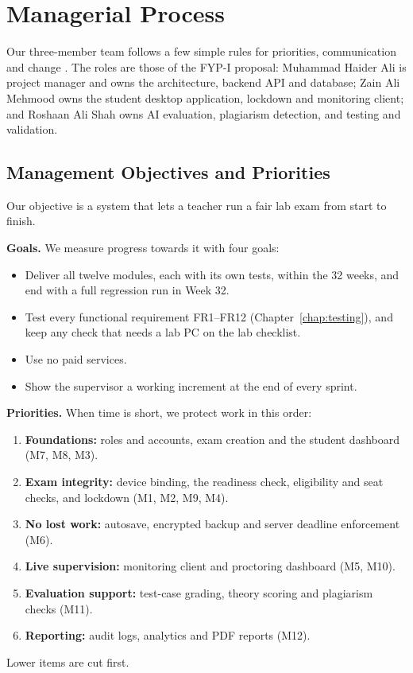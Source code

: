 \section{Managerial Process}
\label{sec:managerial}

Our three-member team follows a few simple rules for priorities, communication and change \cite{pmbok6}. The roles are those of the FYP-I proposal: Muhammad Haider Ali is project manager and owns the architecture, backend API and database; Zain Ali Mehmood owns the student desktop application, lockdown and monitoring client; and Roshaan Ali Shah owns AI evaluation, plagiarism detection, and testing and validation.

\subsection{Management Objectives and Priorities}

Our objective is a system that lets a teacher run a fair lab exam from start to finish.

\DiagramBarrier
\textbf{Goals.} We measure progress towards it with four goals:
\begin{itemize}
    \item Deliver all twelve modules, each with its own tests, within the 32 weeks, and end with a full regression run in Week 32.
    \item Test every functional requirement FR1--FR12 (Chapter~\ref{chap:testing}), and keep any check that needs a lab PC on the lab checklist.
    \item Use no paid services.
    \item Show the supervisor a working increment at the end of every sprint.
\end{itemize}

\textbf{Priorities.} When time is short, we protect work in this order:
\begin{enumerate}
    \item \textbf{Foundations:} roles and accounts, exam creation and the student dashboard (M7, M8, M3).
    \item \textbf{Exam integrity:} device binding, the readiness check, eligibility and seat checks, and lockdown (M1, M2, M9, M4).
    \item \textbf{No lost work:} autosave, encrypted backup and server deadline enforcement (M6).
    \item \textbf{Live supervision:} monitoring client and proctoring dashboard (M5, M10).
    \item \textbf{Evaluation support:} test-case grading, theory scoring and plagiarism checks (M11).
    \item \textbf{Reporting:} audit logs, analytics and PDF reports (M12).
\end{enumerate}
Lower items are cut first.

